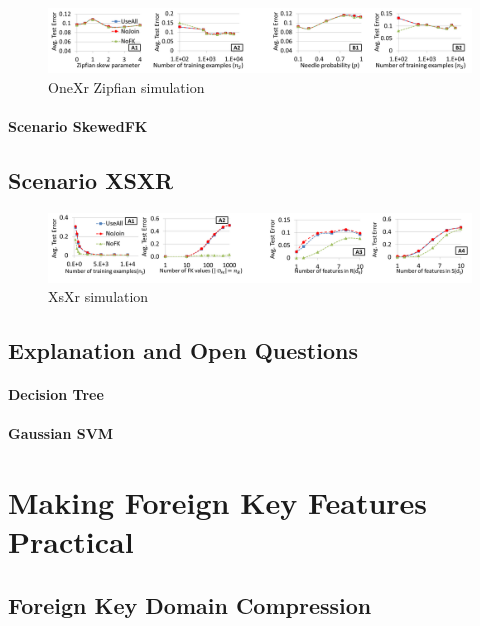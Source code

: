\documentclass[sigconf]{acmart}
\begin{document}
\begin{figure}
\centering
\includegraphics[width=2\columnwidth,height=\textheight,keepaspectratio]{onexr_zipf.png}
\caption{OneXr Zipfian simulation}
\label{Figure:OneXrZipfSimulation}
\end{figure}


\paragraph*{Scenario SkewedFK}


\subsection{Scenario XSXR}
\begin{figure}
\centering
\includegraphics[width=2\columnwidth,height=\textheight,keepaspectratio]{xsxr.png}
\caption{XsXr simulation}
\label{Figure:XsXrSimulation}
\end{figure}

\subsection{Explanation and Open Questions}

\paragraph*{Decision Tree}

\paragraph*{Gaussian SVM}


\section{Making Foreign Key Features Practical}

\subsection{Foreign Key Domain Compression}
\end{document}
